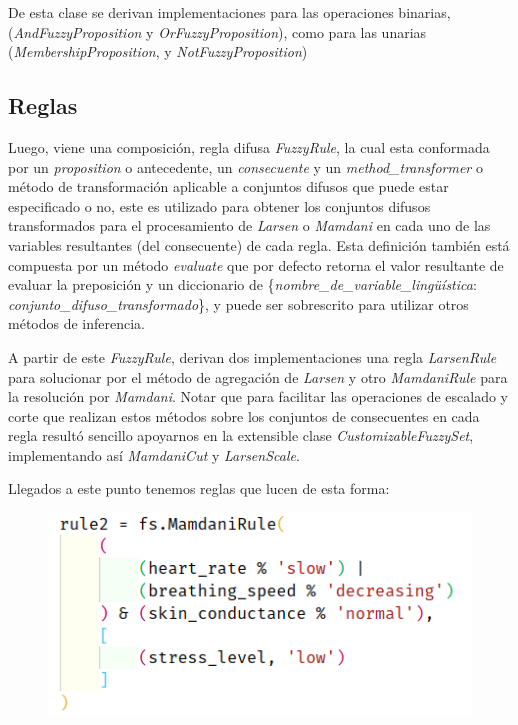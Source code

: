 \documentclass[a4paper,10pt,twocolumn]{article}
\begin{document}
 De esta clase se derivan implementaciones para las operaciones binarias, (\textit{AndFuzzyProposition} y \textit{OrFuzzyProposition}), como para las unarias (\textit{MembershipProposition}, y \textit{NotFuzzyProposition})
 
 \subsection*{Reglas}
 Luego, viene una composici\'on, regla difusa \textit{FuzzyRule}, la cual esta conformada por un \textit{proposition} o antecedente, un \textit{consecuente} y un \textit{method\_transformer} o m\'etodo de transformaci\'on aplicable a conjuntos difusos que puede estar especificado o no, este es utilizado para obtener los conjuntos difusos transformados para el procesamiento de \textit{Larsen} o \textit{Mamdani} en cada uno de las variables resultantes (del consecuente) de cada regla. Esta definici\'on tambi\'en est\'a compuesta por un m\'etodo \textit{evaluate} que por defecto retorna el valor resultante de evaluar la preposici\'on y un diccionario de \{\textit{nombre\_de\_variable\_lingüística}:
 \textit{conjunto\_difuso\_transformado}\}, y puede ser sobrescrito para utilizar otros m\'etodos de inferencia.
 
 A partir de este \textit{FuzzyRule}, derivan dos implementaciones una regla  \textit{LarsenRule} para solucionar por el m\'etodo de agregaci\'on de \textit{Larsen} y otro \textit{MamdaniRule} para la resoluci\'on por \textit{Mamdani}. Notar que para facilitar las operaciones de escalado y corte que realizan estos m\'etodos sobre los conjuntos de consecuentes en cada regla result\'o sencillo apoyarnos en la extensible clase \textit{CustomizableFuzzySet}, implementando as\'i \textit{MamdaniCut} y \textit{LarsenScale}.
  
 Llegados a este punto tenemos reglas que lucen de esta forma:

\begin{figure}[h]	
	\includegraphics[scale=.7]{mamdani-rule.png}
\end{figure}
\end{document}
